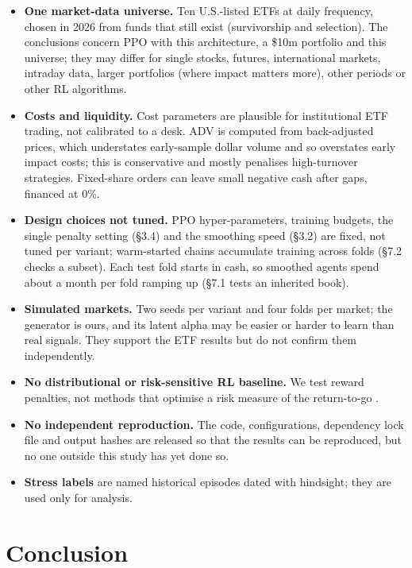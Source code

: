 \documentclass[11pt]{article}
\begin{document}
\begin{itemize}
\item
  \textbf{One market-data universe.} Ten U.S.-listed ETFs at daily frequency, chosen in 2026 from funds that still exist (survivorship and selection). The conclusions concern PPO with this architecture, a \$10m portfolio and this universe; they may differ for single stocks, futures, international markets, intraday data, larger portfolios (where impact matters more), other periods or other RL algorithms.
\item
  \textbf{Costs and liquidity.} Cost parameters are plausible for institutional ETF trading, not calibrated to a desk. ADV is computed from back-adjusted prices, which understates early-sample dollar volume and so overstates early impact costs; this is conservative and mostly penalises high-turnover strategies. Fixed-share orders can leave small negative cash after gaps, financed at 0\%.
\item
  \textbf{Design choices not tuned.} PPO hyper-parameters, training budgets, the single penalty setting (\S{}3.4) and the smoothing speed (\S{}3.2) are fixed, not tuned per variant; warm-started chains accumulate training across folds (\S{}7.2 checks a subset). Each test fold starts in cash, so smoothed agents spend about a month per fold ramping up (\S{}7.1 tests an inherited book).
\item
  \textbf{Simulated markets.} Two seeds per variant and four folds per market; the generator is ours, and its latent alpha may be easier or harder to learn than real signals. They support the ETF results but do not confirm them independently.
\item
  \textbf{No distributional or risk-sensitive RL baseline.} We test reward penalties, not methods that optimise a risk measure of the return-to-go \cite{r21,r54}.
\item
  \textbf{No independent reproduction.} The code, configurations, dependency lock file and output hashes are released so that the results can be reproduced, but no one outside this study has yet done so.
\item
  \textbf{Stress labels} are named historical episodes dated with hindsight; they are used only for analysis.
\end{itemize}

\section{Conclusion}\label{s11}
\end{document}
